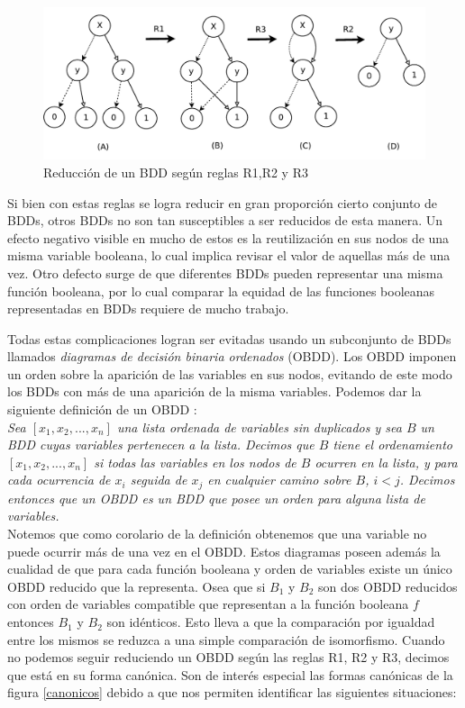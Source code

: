 \documentclass[pdftex,a4paper,12pt]{book}
\begin{document}
\begin{figure}[htp]
  \centering
    \includegraphics[scale=0.75]{Imagenes/reduccionBDD.pdf}
  \caption{Reducci\'on de un BDD seg\'un reglas R1,R2 y R3}
  \label{reduccionBDD}
\end{figure}


Si bien con estas reglas se logra reducir en gran proporci\'on cierto conjunto de BDDs, otros BDDs no son tan susceptibles a ser reducidos de esta manera. Un efecto negativo visible en mucho de estos es la reutilizaci\'on en sus nodos de una misma variable booleana, lo cual implica revisar el valor de aquellas m\'as de una vez. Otro defecto surge de que diferentes BDDs pueden representar una misma funci\'on booleana, por lo cual comparar la equidad de las funciones booleanas representadas en BDDs requiere de mucho trabajo.

Todas estas complicaciones logran ser evitadas usando un subconjunto de BDDs llamados \textit{diagramas de decisi\'on binaria ordenados} (OBDD). Los OBDD imponen un orden sobre la aparici\'on de las variables en sus nodos, evitando de este modo los BDDs con m\'as de una aparici\'on de la misma variables. Podemos dar la siguiente definici\'on de un OBDD \cite{Huth}:\\

\textit{Sea $[x_1,x_2,...,x_n]$ una lista ordenada de variables sin duplicados y sea $B$ un BDD cuyas variables pertenecen a la lista. Decimos que $B$ tiene el ordenamiento $[x_1,x_2,...,x_n]$ si todas las variables en los nodos de $B$ ocurren en la lista, y para cada ocurrencia de $x_i$ seguida de $x_j$ en cualquier camino sobre $B$, $i < j$. Decimos entonces que un OBDD es un BDD que posee un orden para alguna lista de variables.}\\

Notemos que como corolario de la definici\'on obtenemos que una variable no puede ocurrir m\'as de una vez en el OBDD. Estos diagramas poseen adem\'as la cualidad de que para cada funci\'on booleana y orden de variables existe un \'unico OBDD reducido que la representa. Osea que si $B_1$ y $B_2$ son dos OBDD reducidos con orden de variables compatible que representan a la funci\'on booleana $f$ entonces $B_1$ y $B_2$ son id\'enticos. Esto lleva a que la comparaci\'on por igualdad entre los mismos se reduzca a una simple comparaci\'on de isomorfismo. Cuando no podemos seguir reduciendo un OBDD seg\'un las reglas R1, R2 y R3, decimos que est\'a en su forma can\'onica. Son de inter\'es especial las formas can\'onicas de la figura \ref{canonicos} debido a que nos permiten identificar las siguientes situaciones:
\end{document}
